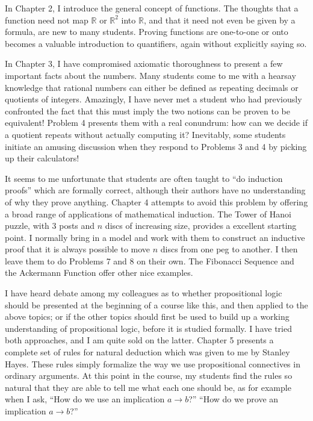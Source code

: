 \documentclass{article}
\newcommand{\0}{\mathbf 0}
\newcommand{\1}{\mathbf 1}
\newcommand\R{\mathbb R}
\begin{document}
In Chapter 2, I introduce the general concept of functions. The thoughts that a function need not map $\R$ or $\R^2$ into $\R$, and that it need not even be given by a formula, are new to many students. Proving functions are one-to-one or onto becomes a valuable introduction to quantifiers, again without explicitly saying so.

In Chapter 3, I have compromised axiomatic thoroughness to present a few important facts about the numbers. Many students come to me with a hearsay knowledge that rational numbers can either be defined as repeating decimals or quotients of integers. Amazingly, I have never met a student who had previously confronted the fact that this must imply the two notions can be proven to be equivalent! Problem 4 presents them with a real conundrum: how can we decide if a quotient repeats without actually computing it? Inevitably, some students initiate an amusing discussion when they respond to Problems 3 and 4 by picking up their calculators!

It seems to me unfortunate that students are often taught to ``do induction proofs'' which are formally correct, although their authors have no understanding of why they prove anything. Chapter 4 attempts to avoid this problem by offering a broad range of applications of mathematical induction. The Tower of Hanoi puzzle, with $3$ posts and $n$ discs of increasing size, provides a excellent starting point. I normally bring in a model and work with them to construct an inductive proof that it is always possible to move $n$ discs from one peg to another. I then leave them to do Problems 7 and 8 on their own. The Fibonacci Sequence and the Ackermann Function offer other nice examples.

I have heard debate among my colleagues as to whether propositional logic should be presented at the beginning of a course like this, and then applied to the above topics; or if the other topics should first be used to build up a working understanding of propositional logic, before it is studied formally. I have tried both approaches, and I am quite sold on the latter. Chapter 5 presents a complete set of rules for natural deduction which was given to me by Stanley Hayes. These rules simply formalize the way we use propositional connectives in ordinary arguments. At this point in the course, my students find the rules so natural that they are able to tell me what each one should be, as for example when I ask, ``How do we use an implication $a \to b$?'' ``How do we prove an implication $a \to b$?''
\end{document}
